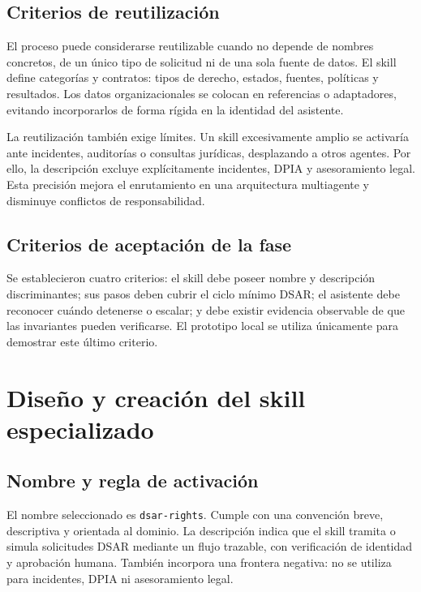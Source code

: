 \documentclass[11pt,a4paper]{article}
\begin{document}
\subsection{Criterios de reutilización}

El proceso puede considerarse reutilizable cuando no depende de nombres concretos, de un único tipo de solicitud ni de una sola fuente de datos. El skill define categorías y contratos: tipos de derecho, estados, fuentes, políticas y resultados. Los datos organizacionales se colocan en referencias o adaptadores, evitando incorporarlos de forma rígida en la identidad del asistente.

La reutilización también exige límites. Un skill excesivamente amplio se activaría ante incidentes, auditorías o consultas jurídicas, desplazando a otros agentes. Por ello, la descripción excluye explícitamente incidentes, DPIA y asesoramiento legal. Esta precisión mejora el enrutamiento en una arquitectura multiagente y disminuye conflictos de responsabilidad.

\subsection{Criterios de aceptación de la fase}

Se establecieron cuatro criterios: el skill debe poseer nombre y descripción discriminantes; sus pasos deben cubrir el ciclo mínimo DSAR; el asistente debe reconocer cuándo detenerse o escalar; y debe existir evidencia observable de que las invariantes pueden verificarse. El prototipo local se utiliza únicamente para demostrar este último criterio.

\section{Diseño y creación del skill especializado}

\subsection{Nombre y regla de activación}

El nombre seleccionado es \texttt{dsar-rights}. Cumple con una convención breve, descriptiva y orientada al dominio. La descripción indica que el skill tramita o simula solicitudes DSAR mediante un flujo trazable, con verificación de identidad y aprobación humana. También incorpora una frontera negativa: no se utiliza para incidentes, DPIA ni asesoramiento legal.
\end{document}

